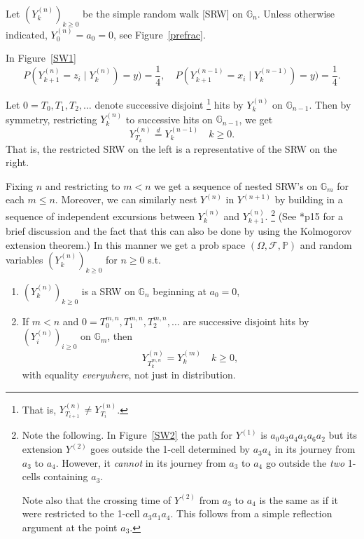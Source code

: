 \documentclass[a4paper]{amsart}
\theoremstyle{plain}
\theoremstyle{definition}
\theoremstyle{remark}
\begin{document}
Let $ (Y_k^{(n)})_{k\geq 0} $ be the simple random walk [SRW] on $ \mathbb{G}_n $.  Unless otherwise indicated, $ Y ^{(n)}_0  = a_0 = 0$, see Figure~\ref{prefrac}.

In Figure~\ref{SW1}
\[ 
P (Y ^{(n)}_{k+1}  = z_i \mid Y ^{(n)}_k) = y) = \frac{1}{4}, \quad 
P (Y ^{(n-1)}_{k+1}  = x_i \mid Y ^{(n-1)}_k) = y) = \frac{1}{4}.
\]

\medskip 

  Let $ 0=T_0, T_1, T_2 ,\dots $ denote successive disjoint%
\footnote{That is, $ Y_{T_{i+1}}^{(n)} \neq Y_{T_{i }}^{(n)}$.}
 hits by $ Y_k^{(n)} $ on $ \mathbb{G}_{n-1} $.
  Then by symmetry, restricting $  Y ^{(n)}_k $ to successive hits on $ \mathbb{G}_{n-1} $, we get 
 \[
 Y^{(n)}_{T_k}  \overset{d}{= }  Y^{(n-1)}_{k}  \quad k\geq 0.
 \]
That is, the restricted SRW on the left is a representative of the SRW on the right.

Fixing $ n $ and restricting to $ m < n  $ we get  a sequence of nested SRW's on $ \mathbb{G}_m $ for each $ m \leq n $.   
  Moreover, we can similarly nest $ Y^{(n)} $ in $ Y^{(n+1)} $ by building in a sequence of independent excursions between $ Y^{(n)}_k $ and $ Y^{(n)}_{k+1} $.%
  \footnote{Note the following.  In Figure~\ref{SW2} the path for $ Y^{(1)} $ is $ a_0a_3a_4a_5 a_6a_2 $ but its extension $  Y^{(2)} $  goes outside the 1-cell determined by $ a_3 a_4 $ in its journey from  $ a_3 $ to $ a_4 $.
  However, it \emph{cannot} in its journey from $ a_3 $ to $ a_4 $ go outside the \emph{two} 1-cells containing $ a_3 $.
  
  Note also that the crossing time of $  Y^{(2)} $ from $ a_3 $ to $ a_4 $ is the same as if it were restricted to the 1-cell $ a_3a_1a_4 $.  This follows from a simple reflection argument at the point $ a_3$.}
 (See \cite{Bar1}*{p15} for a brief discussion and the fact that this can also  be done by using the Kolmogorov extension theorem.)  In this manner we get a prob space $ (\Omega, \mathcal{F}, \mathbb{P} ) $ and random variables $ (Y^{(n)}_k)_{k\geq 0} $ for $ n\geq 0 $ s.t.
  \begin{enumerate}
\item  $ (Y^{(n)}_k)_{k\geq 0}$ is a  SRW on $ \mathbb{G} _n $ beginning at $ a_0 =0 $,
  \item  If $ m< n $ and $ 0=T_0^{m,n} , T_1^{m,n}, T_2^{m,n} , \dots $ are successive disjoint hits by $ (Y^{(n)}_i)_{i\geq 0} $ on $ \mathbb{G}_m $, then 
\begin{equation} \label{sp} 
    Y^{(n)}_{T_k^{m,n}} = Y^{(m)}_{k}  \quad k\geq 0,
\end{equation} 
with equality \emph{everywhere}, not just in distribution.
\end{enumerate}
\end{document}
